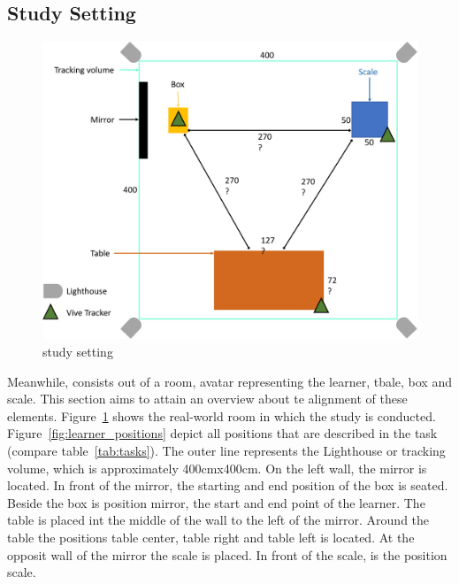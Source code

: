 \subsection{Study Setting}
\begin{figure}[H]
	\centering
	\includegraphics[width=\textwidth]{figures/study_setting.png}
	\caption[study setting]{study setting}
	\label{fig:study_setting}
\end{figure}
Meanwhile, \exgo consists out of a room, avatar representing the learner, tbale, box and scale. This section aims to attain an overview about te alignment of these elements. Figure~\ref{fig:study_setting} shows the real-world room in which the study is conducted. Figure~\ref{fig:learner_positions} depict all positions that are described in the task (compare table~\ref{tab:tasks}). The outer line represents the Lighthouse or tracking volume, which is approximately 400cmx400cm. On the left wall, the mirror is located. In front of the mirror, the starting and end position of the box is seated. Beside the box is position mirror, the start and end point of the learner. The table is placed int the middle of the wall to the left of the mirror. Around the table the positions table center, table right and table left is located. At the opposit wall of the mirror the scale is placed. In front of the scale, is the position scale.
